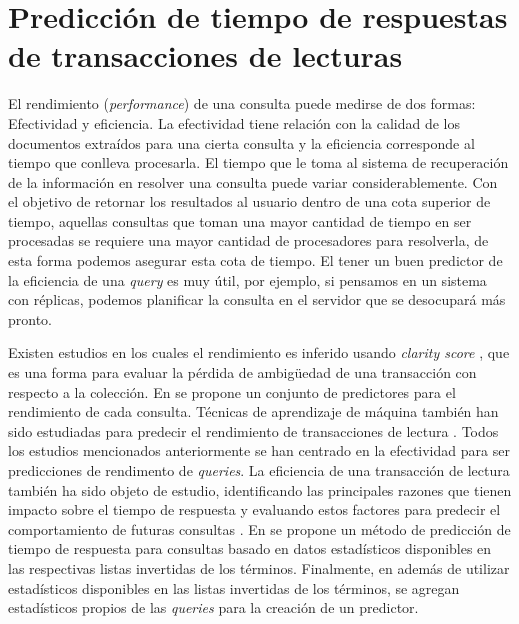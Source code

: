 \section{Predicción de tiempo de respuestas de transacciones de lecturas}
\label{marco:prediccion}
El rendimiento (\textit{performance}) de una consulta puede medirse de dos formas: Efectividad y eficiencia. La efectividad tiene relación con la calidad de los documentos extraídos para una cierta consulta y la eficiencia corresponde al tiempo que conlleva procesarla. El tiempo que le toma al sistema de recuperación de la información en resolver una consulta puede variar considerablemente. Con el objetivo de retornar los resultados al usuario dentro de una cota superior de tiempo, aquellas consultas que toman una mayor cantidad de tiempo en ser procesadas se requiere una mayor cantidad de procesadores para resolverla, de esta forma podemos asegurar esta cota de tiempo. El tener un buen predictor de la eficiencia de una \textit{query} es muy útil, por ejemplo, si pensamos en un sistema con réplicas, podemos planificar la consulta en el servidor que se desocupará más pronto. 

Existen estudios en los cuales el rendimiento es inferido usando \textit{clarity score} \citep{Cronen-Townsend:2002}, que es una forma para evaluar la pérdida de ambigüedad de una transacción con respecto a la colección. En \citep{He:2004} se propone un conjunto de predictores para el rendimiento de cada consulta. Técnicas de aprendizaje de máquina también han sido estudiadas para predecir el rendimiento de transacciones de lectura \citep{Si:2002}. Todos los estudios mencionados anteriormente se han centrado en la efectividad para ser predicciones de rendimento de \textit{queries}. La eficiencia de una transacción de lectura también ha sido objeto de estudio, identificando las principales razones que tienen impacto sobre el tiempo de respuesta y evaluando estos factores para predecir el comportamiento de futuras consultas \citep{Tonellotto:2011}. En \citep{Macdonald:2012} se propone un método de predicción de tiempo de respuesta para consultas basado en datos estadísticos disponibles en las respectivas listas invertidas de los términos. Finalmente, en \citep{Jeon:2014} además de utilizar estadísticos disponibles en las listas invertidas de los términos, se agregan estadísticos propios de las \textit{queries} para la creación de un predictor. 


